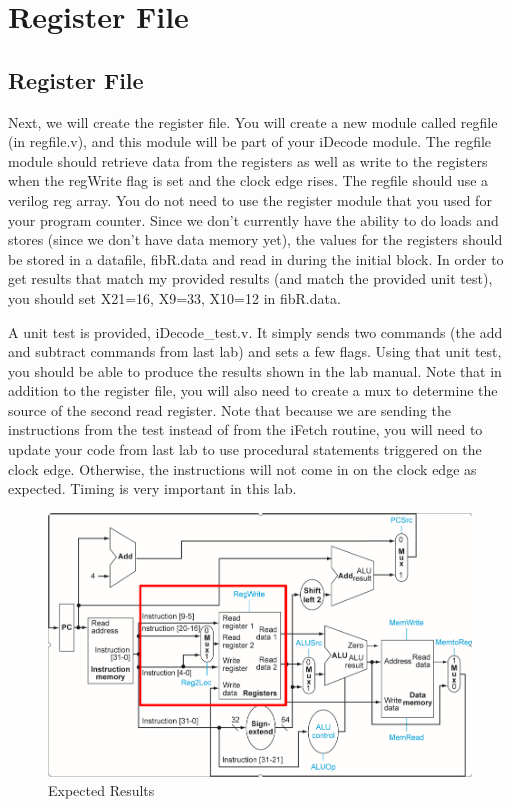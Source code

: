 \chapter{Register File}

\section{Register File}

Next, we will create the register file.  You will create a new module called regfile (in regfile.v), and this module will be part of your iDecode module.  The regfile module should retrieve data from the registers as well as write to the registers when the regWrite flag is set and the clock edge rises.  The regfile should use a verilog reg array.  You do not need to use the register module that you used for your program counter.  Since we don't currently have the ability to do loads and stores (since we don't have data memory yet), the values for the registers should be stored in a datafile, fibR.data and read in during the initial block.  In order to get results that match my provided results (and match the provided unit test), you should set X21=16, X9=33, X10=12 in fibR.data.

A unit test is provided, iDecode\_test.v.  It simply sends two commands (the add and subtract commands from last lab) and sets a few flags.  Using that unit test, you should be able to produce the results shown in the lab manual.  Note that in addition to the register file, you will also need to create a mux to determine the source of the second read register.  Note that because we are sending the instructions from the test instead of from the iFetch routine, you will need to update your code from last lab to use procedural statements triggered on the clock edge.  Otherwise, the instructions will not come in on the clock edge as expected.  Timing is very important in this lab.

\begin{figure}
	\caption{Expected Results}\label{fig:register_file_cutout}
	\begin{center}
		\includegraphics[width=4.75in]{../images/register_file_cutout.png}
	\end{center}
\end{figure} 

